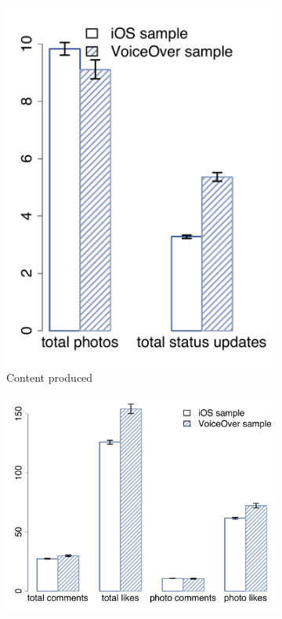 \documentclass{sigchi}
\begin{document}
\begin{figure}[t]
\centering
\begin{subfigure}[b]{0.22\textwidth}
    \includegraphics[width=\columnwidth]{content_produce.pdf}
    \caption{Content produced}
    \label{fig:content_produce}
 \end{subfigure}
\begin{subfigure}[b]{0.35\textwidth}
    \includegraphics[width=\columnwidth]{feedback_send.pdf}

\end{subfigure}
\end{figure}
\end{document}
